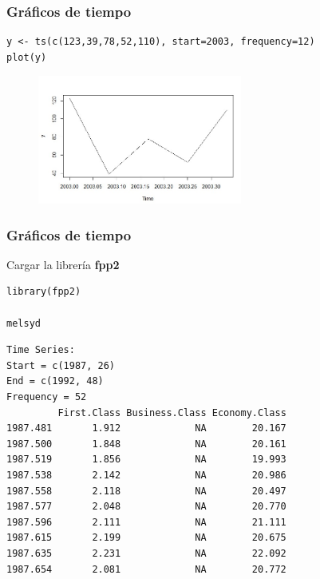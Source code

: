 \documentclass[10pt]{beamer}
\begin{document}





\begin{frame}[fragile]
\frametitle{Gráficos de tiempo}


\lstset{language=r,label= ,caption= ,captionpos=b,numbers=none}
\begin{lstlisting}
y <- ts(c(123,39,78,52,110), start=2003, frequency=12)
plot(y)
\end{lstlisting}

\pause



\begin{figure}
\begin{center}
    \includegraphics[width=0.6\textwidth]{Imagen12.JPG}
\end{center}
\end{figure}




\end{frame}





\begin{frame}[fragile]
\frametitle{Gráficos de tiempo}

Cargar la librería \textbf{fpp2}

\lstset{language=r,label= ,caption= ,captionpos=b,numbers=none}
\begin{lstlisting}
library(fpp2)

melsyd

\end{lstlisting}

\pause

{\scriptsize
\begin{verbatim}
Time Series:
Start = c(1987, 26) 
End = c(1992, 48) 
Frequency = 52 
         First.Class Business.Class Economy.Class
1987.481       1.912             NA        20.167
1987.500       1.848             NA        20.161
1987.519       1.856             NA        19.993
1987.538       2.142             NA        20.986
1987.558       2.118             NA        20.497
1987.577       2.048             NA        20.770
1987.596       2.111             NA        21.111
1987.615       2.199             NA        20.675
1987.635       2.231             NA        22.092
1987.654       2.081             NA        20.772
\end{verbatim}
}




\end{frame}
\end{document}
